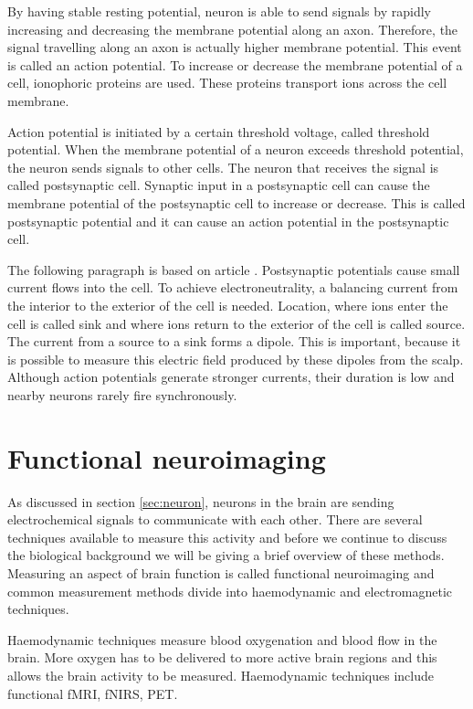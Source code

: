 By having stable resting potential, neuron is able to send signals by rapidly increasing and decreasing the membrane potential along an axon. Therefore, the signal travelling along an axon is actually higher membrane potential. This event is called an action potential. To increase or decrease the membrane potential of a cell, ionophoric proteins are used. These proteins transport ions across the cell membrane.

Action potential is initiated by a certain threshold voltage, called threshold potential. When the membrane potential of a neuron exceeds threshold potential, the neuron sends signals to other cells. The neuron that receives the signal is called postsynaptic cell. Synaptic input in a postsynaptic cell can cause the membrane potential of the postsynaptic cell to increase or decrease. This is called postsynaptic potential and it can cause an action potential in the postsynaptic cell.

The following paragraph is based on article \cite{electric_field}. Postsynaptic potentials cause small current flows into the cell. To achieve electroneutrality, a balancing current from the interior to the exterior of the cell is needed. Location, where ions enter the cell is called sink and where ions return to the exterior of the cell is called source. The current from a source to a sink forms a dipole. This is important, because it is possible to measure this electric field produced by these dipoles from the scalp. Although action potentials generate stronger currents, their duration is low and nearby neurons rarely fire synchronously.

\section{Functional neuroimaging}
\label{sec:neuroimaging}

As discussed in section \ref{sec:neuron}, neurons in the brain are sending electrochemical signals to communicate with each other. There are several techniques available to measure this activity and before we continue to discuss the biological background we will be giving a brief overview of these methods. Measuring an aspect of brain function is called functional neuroimaging and common measurement methods divide into haemodynamic and electromagnetic techniques.

Haemodynamic techniques measure blood oxygenation and blood flow in the brain. More oxygen has to be delivered to more active brain regions and this allows the brain activity to be measured. Haemodynamic techniques include functional \acrfull{fMRI}, \acrfull{fNIRS}, \acrfull{PET}.

